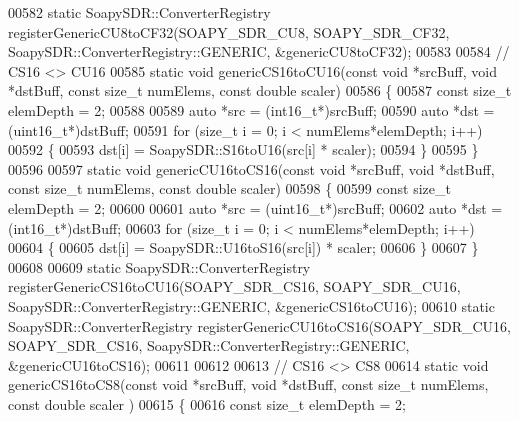 \begin{DoxyCode}
00582 \textcolor{keyword}{static} SoapySDR::ConverterRegistry registerGenericCU8toCF32(SOAPY_SDR_CU8, 
      SOAPY_SDR_CF32, SoapySDR::ConverterRegistry::GENERIC, &genericCU8toCF32);
00583 
00584 \textcolor{comment}{// CS16 <> CU16}
00585 \textcolor{keyword}{static} \textcolor{keywordtype}{void} genericCS16toCU16(\textcolor{keyword}{const} \textcolor{keywordtype}{void} *srcBuff, \textcolor{keywordtype}{void} *dstBuff, \textcolor{keyword}{const} \textcolor{keywordtype}{size\_t} numElems, \textcolor{keyword}{const} \textcolor{keywordtype}{double} 
      scaler)
00586 \{
00587   \textcolor{keyword}{const} \textcolor{keywordtype}{size\_t} elemDepth = 2;
00588 
00589   \textcolor{keyword}{auto} *src = (int16\_t*)srcBuff;
00590   \textcolor{keyword}{auto} *dst = (uint16\_t*)dstBuff;
00591   \textcolor{keywordflow}{for} (\textcolor{keywordtype}{size\_t} i = 0; i < numElems*elemDepth; i++)
00592     \{
00593       dst[i] = SoapySDR::S16toU16(src[i] * scaler);
00594     \}
00595 \}
00596 
00597 \textcolor{keyword}{static} \textcolor{keywordtype}{void} genericCU16toCS16(\textcolor{keyword}{const} \textcolor{keywordtype}{void} *srcBuff, \textcolor{keywordtype}{void} *dstBuff, \textcolor{keyword}{const} \textcolor{keywordtype}{size\_t} numElems, \textcolor{keyword}{const} \textcolor{keywordtype}{double} 
      scaler)
00598 \{
00599   \textcolor{keyword}{const} \textcolor{keywordtype}{size\_t} elemDepth = 2;
00600 
00601   \textcolor{keyword}{auto} *src = (uint16\_t*)srcBuff;
00602   \textcolor{keyword}{auto} *dst = (int16\_t*)dstBuff;
00603   \textcolor{keywordflow}{for} (\textcolor{keywordtype}{size\_t} i = 0; i < numElems*elemDepth; i++)
00604     \{
00605       dst[i] = SoapySDR::U16toS16(src[i]) * scaler;
00606     \}
00607 \}
00608 
00609 \textcolor{keyword}{static} SoapySDR::ConverterRegistry registerGenericCS16toCU16(SOAPY_SDR_CS16, 
      SOAPY_SDR_CU16, SoapySDR::ConverterRegistry::GENERIC, &genericCS16toCU16);
00610 \textcolor{keyword}{static} SoapySDR::ConverterRegistry registerGenericCU16toCS16(SOAPY_SDR_CU16, 
      SOAPY_SDR_CS16, SoapySDR::ConverterRegistry::GENERIC, &genericCU16toCS16);
00611 
00612 
00613 \textcolor{comment}{// CS16 <> CS8}
00614 \textcolor{keyword}{static} \textcolor{keywordtype}{void} genericCS16toCS8(\textcolor{keyword}{const} \textcolor{keywordtype}{void} *srcBuff, \textcolor{keywordtype}{void} *dstBuff, \textcolor{keyword}{const} \textcolor{keywordtype}{size\_t} numElems, \textcolor{keyword}{const} \textcolor{keywordtype}{double} scaler
      )
00615 \{
00616   \textcolor{keyword}{const} \textcolor{keywordtype}{size\_t} elemDepth = 2;

\end{DoxyCode}
